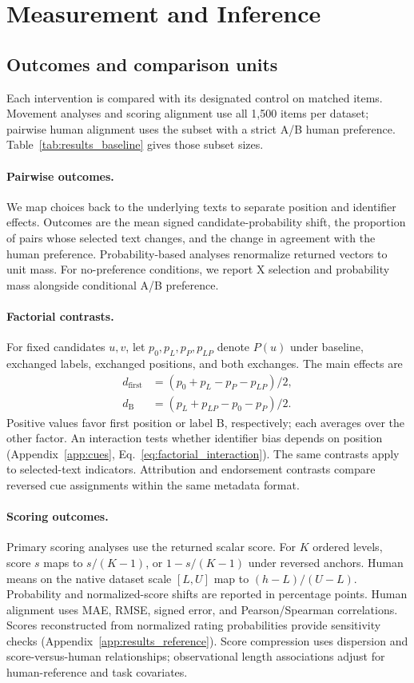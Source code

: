 \documentclass[11pt]{article}
\begin{document}
\FloatBarrier
\section{Measurement and Inference}
\label{sec:analysis}
\subsection{Outcomes and comparison units}
Each intervention is compared with its designated control on matched items. Movement analyses and scoring alignment use all 1,500 items per dataset; pairwise human alignment uses the subset with a strict A/B human preference. Table~\ref{tab:results_baseline} gives those subset sizes.

\paragraph{Pairwise outcomes.}
We map choices back to the underlying texts to separate position and identifier effects. Outcomes are the mean signed candidate-probability shift, the proportion of pairs whose selected text changes, and the change in agreement with the human preference. Probability-based analyses renormalize returned vectors to unit mass. For no-preference conditions, we report X selection and probability mass alongside conditional A/B preference.

\paragraph{Factorial contrasts.}
For fixed candidates $u,v$, let $p_0,p_L,p_P,p_{LP}$ denote $P(u)$ under baseline, exchanged labels, exchanged positions, and both exchanges. The main effects are
\begin{align}
d_{\mathrm{first}}&=(p_0+p_L-p_P-p_{LP})/2,\\
d_{\mathrm{B}}&=(p_L+p_{LP}-p_0-p_P)/2.
\end{align}
Positive values favor first position or label B, respectively; each averages over the other factor. An interaction tests whether identifier bias depends on position (Appendix~\ref{app:cues}, Eq.~\ref{eq:factorial_interaction}). The same contrasts apply to selected-text indicators. Attribution and endorsement contrasts compare reversed cue assignments within the same metadata format.

\paragraph{Scoring outcomes.}
Primary scoring analyses use the returned scalar score. For $K$ ordered levels, score $s$ maps to $s/(K-1)$, or $1-s/(K-1)$ under reversed anchors. Human means on the native dataset scale $[L,U]$ map to $(h-L)/(U-L)$. Probability and normalized-score shifts are reported in percentage points. Human alignment uses MAE, RMSE, signed error, and Pearson/Spearman correlations. Scores reconstructed from normalized rating probabilities provide sensitivity checks (Appendix~\ref{app:results_reference}). Score compression uses dispersion and score-versus-human relationships; observational length associations adjust for human-reference and task covariates.
\end{document}
